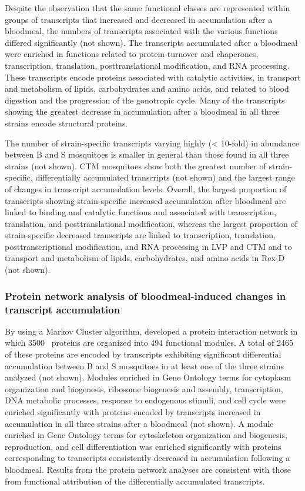 Despite the observation that the same functional classes are represented within groups of transcripts that increased and decreased in accumulation after a bloodmeal, the numbers of transcripts associated with the various functions differed significantly (not shown).
The transcripts accumulated after a bloodmeal were enriched in functions related to protein-turnover and chaperones, transcription, translation, posttranslational modification, and RNA processing.
These transcripts encode proteins associated with catalytic activities, in transport and metabolism of lipids, carbohydrates and amino acids, and related to blood digestion and the progression of the gonotropic cycle.
Many of the transcripts showing the greatest decrease in accumulation after a bloodmeal in all three strains encode structural proteins.

The number of strain-specific transcripts varying highly (< 10-fold) in abundance between B and S mosquitoes is smaller in general than those found in all three strains (not shown).
\gls{CTM} mosquitoes show both the greatest number of strain-specific, differentially accumulated transcripts (not shown) and the largest range of changes in transcript accumulation levels.
Overall, the largest proportion of transcripts showing strain-specific increased accumulation after bloodmeal are linked to binding and catalytic functions and associated with transcription, translation, and posttranslational modification, whereas the largest proportion of strain-specific decreased transcripts are linked to transcription, translation, posttranscriptional modification, and RNA processing in \gls{LVP} and \gls{CTM} and to transport and metabolism of lipids, carbohydrates, and amino acids in \gls{Rex-D} (not shown).


\subsubsection{Protein network analysis of bloodmeal-induced changes in transcript accumulation}

By using a Markov Cluster algorithm, \cite{Guo2010} developed a protein interaction network in which 3500 \Aa\ proteins are organized into 494 functional modules.
A total of 2465 of these proteins are encoded by transcripts exhibiting significant differential accumulation between B and S mosquitoes in at least one of the three strains analyzed (not shown).
Modules enriched in Gene Ontology terms for cytoplasm organization and biogenesis, ribosome biogenesis and assembly, transcription, DNA metabolic processes, response to endogenous stimuli, and cell cycle were enriched significantly with proteins encoded by transcripts increased in accumulation in all three strains after a bloodmeal (not shown).
A module enriched in Gene Ontology terms for cytoskeleton organization and biogenesis, reproduction, and cell differentiation was enriched significantly with proteins corresponding to transcripts consistently decreased in accumulation following a bloodmeal.
Results from the protein network analyses are consistent with those from functional attribution of the differentially accumulated transcripts.

